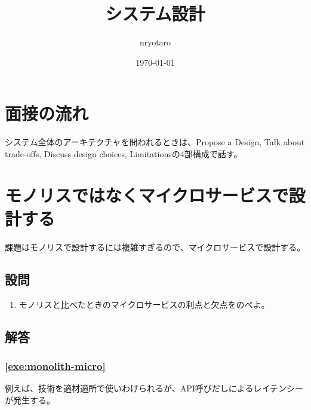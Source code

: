\documentclass{jlreq}
\begin{document}
\title{システム設計}
\author{nryotaro}
\date{\today}
\maketitle
\tableofcontents
\section{面接の流れ}
\begin{refsection}
  システム全体のアーキテクチャを問われるときは、Propose a Design, Talk about trade-offs, Discuss design choices, Limitationsの4部構成で話す\cite{lc-high}。
  \printjbibliography
\end{refsection}
\section{モノリスではなくマイクロサービスで設計する}
\begin{refsection}
  課題はモノリスで設計するには複雑すぎるので、マイクロサービスで設計する\cite{lc-aa}。
  \subsection{設問}
  \begin{enumerate}[label=問題\arabic*,labelsep=10pt,leftmargin=*]
  \item モノリスと比べたときのマイクロサービスの利点と欠点をのべよ。\label{exe:monolith-micro}
  \end{enumerate}
  \subsection{解答}
  \subsubsection*{\ref{exe:monolith-micro}}
  例えば、技術を適材適所で使いわけられるが、API呼びだしによるレイテンシーが発生する\cite{lc-aa}。
  \printjbibliography
\end{refsection}
\end{document}
